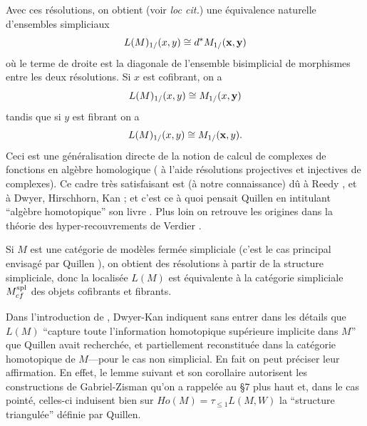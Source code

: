 \documentclass[12pt]{article}
\begin{document}
Avec ces r\'esolutions, on obtient (voir {\em loc cit.}) une
\'equivalence naturelle d'ensembles simpliciaux
$$
L(M)_{1/}(x,y) \cong d^{\ast} M_{1/}({\bf x}, {\bf y})
$$
o\`u le terme de droite est la diagonale de l'ensemble bisimplicial de
morphismes entre les deux r\'esolutions. Si $x$ est cofibrant, on a
$$
L(M)_{1/}(x,y)\cong M_{1/}(x, {\bf y})
$$
tandis que si $y$ est fibrant on a
$$
L(M)_{1/}(x,y)\cong M_{1/}({\bf x}, y).
$$
Ceci est une  g\'en\'eralisation directe de la notion de
calcul de complexes de fonctions en alg\`ebre homologique ( \`a l'aide
r\'esolutions
projectives et injectives de complexes). Ce cadre tr\`es satisfaisant est (\`a
notre connaissance) d\^u \`a  Reedy \cite{Reedy}, et \`a Dwyer,
Hirschhorn, Kan \cite{DHK} \cite{Hirschhorn} \cite{DwyerKan3}; et c'est ce \`a
quoi pensait Quillen en intitulant ``alg\`ebre homotopique'' son livre
\cite{Quillen}. Plus loin on retrouve les origines dans la th\'eorie des
hyper-recouvrements de
Verdier \cite{SGA4b}.

Si $M$ est une
cat\'egorie de mod\`eles ferm\'ee simpliciale (c'est le cas principal
envisag\'e par Quillen \cite{Quillen}), on obtient des
r\'esolutions \`a partir de la structure simpliciale, donc la localis\'ee
$L(M)$ est
\'equivalente \`a
la cat\'egorie simpliciale $M^{\rm spl}_{cf}$ des objets cofibrants
et fibrants.

Dans l'introduction de \cite{DwyerKan3}, Dwyer-Kan indiquent sans
entrer dans les d\'etails que $L(M)$ ``capture toute l'information  homotopique
sup\'erieure implicite dans $M$''   que Quillen \cite{Quillen} avait
recherch\'ee, et partiellement reconstitu\'ee dans la cat\'egorie homotopique de
$M$---pour le cas non simplicial. En fait on peut pr\'eciser leur affirmation.
En effet, le lemme suivant et son corollaire autorisent
les constructions de Gabriel-Zisman qu'on a rappel\'ee au \S 7 plus haut
et, dans le cas point\'e, celles-ci induisent bien
sur $Ho(M)=\tau _{\leq 1}
L(M,W)$
la ``structure triangul\'ee'' d\'efinie par Quillen.
\end{document}
